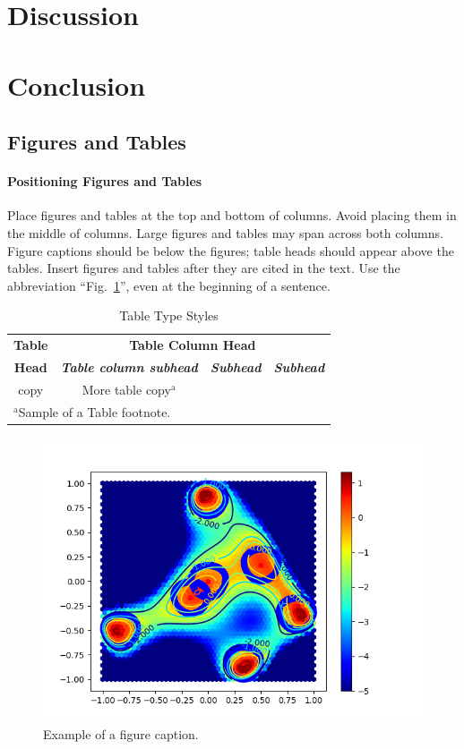 \documentclass[conference]{IEEEtran}
\begin{document}
\section{Discussion}
\section{Conclusion}

\subsection{Figures and Tables}
\paragraph{Positioning Figures and Tables} Place figures and tables at the top and 
bottom of columns. Avoid placing them in the middle of columns. Large 
figures and tables may span across both columns. Figure captions should be 
below the figures; table heads should appear above the tables. Insert 
figures and tables after they are cited in the text. Use the abbreviation 
``Fig.~\ref{fig}'', even at the beginning of a sentence.

\begin{table}[htbp]
\caption{Table Type Styles}
\begin{center}
\begin{tabular}{|c|c|c|c|}
\hline
\textbf{Table}&\multicolumn{3}{|c|}{\textbf{Table Column Head}} \\
\cline{2-4} 
\textbf{Head} & \textbf{\textit{Table column subhead}}& \textbf{\textit{Subhead}}& \textbf{\textit{Subhead}} \\
\hline
copy& More table copy$^{\mathrm{a}}$& &  \\
\hline
\multicolumn{4}{l}{$^{\mathrm{a}}$Sample of a Table footnote.}
\end{tabular}
\label{tab2}
\end{center}
\end{table}

\begin{figure}[htbp]
\centerline{\includegraphics[scale=0.5]{fig1}}
\caption{Example of a figure caption.}
\label{fig}
\end{figure}
\end{document}
